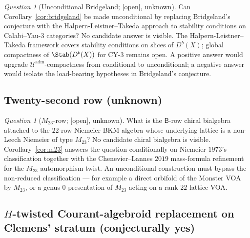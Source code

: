\documentclass[11pt,reqno]{amsart}
\theoremstyle{plain}
\theoremstyle{definition}
\theoremstyle{remark}
\newtheorem{question}[theorem]{Question}
\providecommand{\ClaimStatusOpen}{\textnormal{[open]}}
\newcommand{\cU}{\mathcal{U}}
\newcommand{\sfB}{\mathsf{B}}
\begin{document}
\begin{question}[Unconditional Bridgeland; \ClaimStatusOpen, unknown]
Can Corollary~\ref{cor:bridgeland} be made unconditional by replacing Bridgeland's conjecture with the Halpern-Leistner--Takeda approach to stability conditions on Calabi--Yau-$3$ categories? No candidate answer is visible. The Halpern-Leistner--Takeda framework covers stability conditions on slices of $D^b(X)$; global compactness of $\Stab(D^b(X))$ for CY-$3$ remains open. A positive answer would upgrade $\cU^{\mathrm{adm}}$-compactness from conditional to unconditional; a negative answer would isolate the load-bearing hypotheses in Bridgeland's conjecture.
\end{question}

\subsection{Twenty-second row (unknown)}

\begin{question}[$M_{23}$-row; \ClaimStatusOpen, unknown]
What is the $\sfB$-row chiral bialgebra attached to the $22$-row Niemeier BKM algebra whose underlying lattice is a non-Leech Niemeier of type $M_{23}$? No candidate chiral bialgebra is visible. Corollary~\ref{cor:m23} answers the question conditionally on Niemeier $1973$'s classification together with the Chenevier--Lannes $2019$ mass-formula refinement for the $M_{23}$-automorphism twist. An unconditional construction must bypass the non-reduced classification --- for example a direct orbifold of the Monster VOA by $M_{23}$, or a genus-$0$ presentation of $M_{23}$ acting on a rank-$22$ lattice VOA.
\end{question}

\subsection{$H$-twisted Courant-algebroid replacement on Clemens' stratum (conjecturally yes)}
\end{document}
